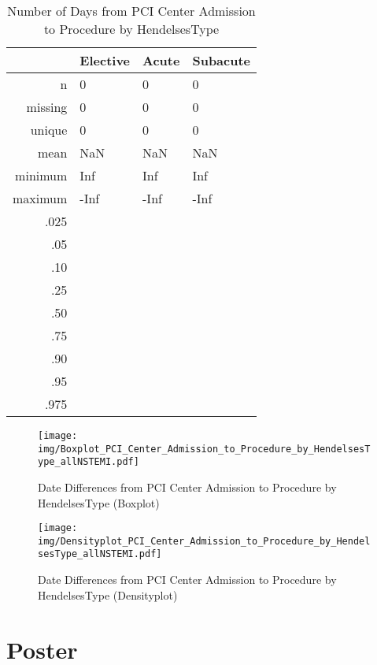 \documentclass[a4paper]{report}
\begin{document}
\begin{itemize}
{%
\begin{table}[ht]
\centering
\begin{tabular}{rlll}
  \toprule
 & Elective & Acute & Subacute \\ 
  \midrule
n & 0 & 0 & 0 \\ 
  missing & 0 & 0 & 0 \\ 
  unique & 0 & 0 & 0 \\ 
  mean & NaN & NaN & NaN \\ 
  minimum & Inf & Inf & Inf \\ 
  maximum & -Inf & -Inf & -Inf \\ 
  .025 &  &  &  \\ 
  .05 &  &  &  \\ 
  .10 &  &  &  \\ 
  .25 &  &  &  \\ 
  .50 &  &  &  \\ 
  .75 &  &  &  \\ 
  .90 &  &  &  \\ 
  .95 &  &  &  \\ 
  .975 &  &  &  \\ 
   \bottomrule
\end{tabular}
\caption{Number of Days from PCI Center Admission to Procedure by HendelsesType} 
\end{table}
\begin{figure}
  \centering
  \caption{Date Differences from PCI Center Admission to Procedure by HendelsesType (Boxplot)}
  \label{Boxplot: Date Differences from PCI Center Admission to Procedure by HendelsesType}
\texttt{[image: img/Boxplot\_PCI\_Center\_Admission\_to\_Procedure\_by\_HendelsesType\_allNSTEMI.pdf]}\end{figure}


\begin{figure}
  \centering
  \caption{Date Differences from PCI Center Admission to Procedure by HendelsesType (Densityplot)}
  \label{Density: Date Differences from PCI Center Admission to Procedure by HendelsesType}
\texttt{[image: img/Densityplot\_PCI\_Center\_Admission\_to\_Procedure\_by\_HendelsesType\_allNSTEMI.pdf]}\end{figure}





\chapter{Poster}

}
\end{itemize}
\end{document}
